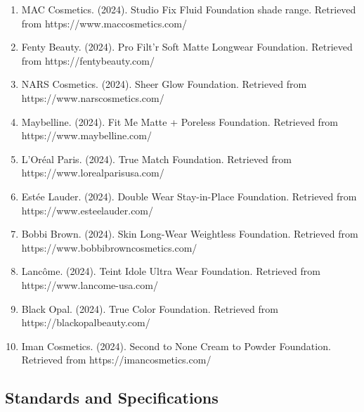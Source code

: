 \begin{enumerate}[resume]

\item MAC Cosmetics. (2024). Studio Fix Fluid Foundation shade range. Retrieved from https://www.maccosmetics.com/

\item Fenty Beauty. (2024). Pro Filt'r Soft Matte Longwear Foundation. Retrieved from https://fentybeauty.com/

\item NARS Cosmetics. (2024). Sheer Glow Foundation. Retrieved from https://www.narscosmetics.com/

\item Maybelline. (2024). Fit Me Matte + Poreless Foundation. Retrieved from https://www.maybelline.com/

\item L'Oréal Paris. (2024). True Match Foundation. Retrieved from https://www.lorealparisusa.com/

\item Estée Lauder. (2024). Double Wear Stay-in-Place Foundation. Retrieved from https://www.esteelauder.com/

\item Bobbi Brown. (2024). Skin Long-Wear Weightless Foundation. Retrieved from https://www.bobbibrowncosmetics.com/

\item Lancôme. (2024). Teint Idole Ultra Wear Foundation. Retrieved from https://www.lancome-usa.com/

\item Black Opal. (2024). True Color Foundation. Retrieved from https://blackopalbeauty.com/

\item Iman Cosmetics. (2024). Second to None Cream to Powder Foundation. Retrieved from https://imancosmetics.com/

\end{enumerate}

\subsection*{Standards and Specifications}

